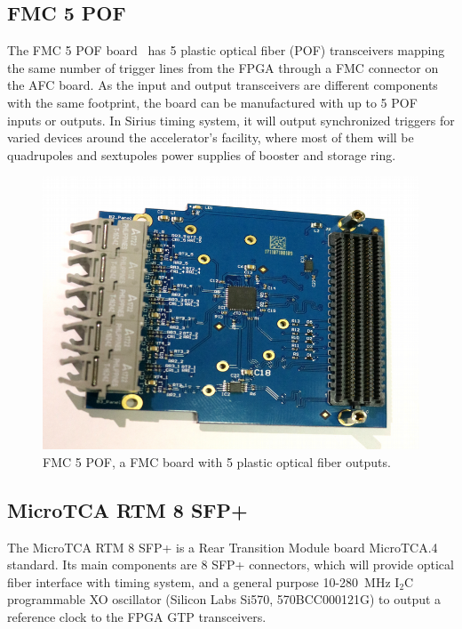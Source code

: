 \documentclass[a4paper,
               biblatex,      %
               ]{jacow}
\begin{document}
\subsection{FMC 5 POF}


The FMC 5 POF board~\cite{fmc-pof-git} has 5 plastic optical fiber (POF) transceivers mapping the same number of trigger lines from the FPGA through a FMC connector on the AFC board. As the input and output transceivers are different components with the same footprint, the board can be manufactured with up to 5 POF inputs or outputs. In Sirius timing system, it will output synchronized triggers for varied devices around the accelerator's facility, where most of them will be quadrupoles and sextupoles power supplies of booster and storage ring.

\begin{figure}[!htb]
   \centering
   \includegraphics*[width=0.5\columnwidth]{FMC_POF_resized}
   \caption{FMC 5 POF, a FMC board with 5 plastic optical fiber outputs.}
   \label{fig:fmc_pof}
\end{figure}

\subsection{MicroTCA RTM 8 SFP+}
The MicroTCA RTM 8 SFP+ \cite{rtm-sfp-git} is a Rear Transition Module board MicroTCA.4 standard. Its main components are 8 SFP+ connectors, which will provide optical fiber interface with timing system, and a general purpose 10-280~MHz I$_{2}$C programmable XO oscillator (Silicon Labs Si570, 570BCC000121G) to output a reference clock to the FPGA GTP transceivers. 
\end{document}

